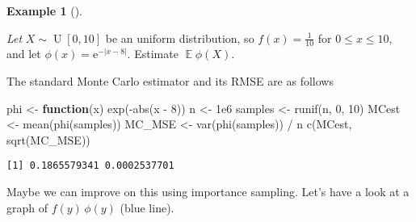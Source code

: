 \documentclass[
  letterpaper,
  DIV=11,
  numbers=noendperiod]{scrreprt}
\newenvironment{Shaded}{\begin{snugshade}}{\end{snugshade}}
\newcommand{\ControlFlowTok}[1]{\textcolor[rgb]{0.00,0.23,0.31}{\textbf{#1}}}
\newcommand{\DecValTok}[1]{\textcolor[rgb]{0.68,0.00,0.00}{#1}}
\newcommand{\FloatTok}[1]{\textcolor[rgb]{0.68,0.00,0.00}{#1}}
\newcommand{\FunctionTok}[1]{\textcolor[rgb]{0.28,0.35,0.67}{#1}}
\newcommand{\NormalTok}[1]{\textcolor[rgb]{0.00,0.23,0.31}{#1}}
\newcommand{\OtherTok}[1]{\textcolor[rgb]{0.00,0.23,0.31}{#1}}
\newcommand{\SpecialCharTok}[1]{\textcolor[rgb]{0.37,0.37,0.37}{#1}}
\newcommand{\Exg}{\operatorname{\mathbb{E}}}
\theoremstyle{plain}
\theoremstyle{definition}
\theoremstyle{definition}
\newtheorem{example}{Example}[chapter]
\theoremstyle{remark}
\begin{document}
\begin{example}[]\protect\hypertarget{exm-ISnew}{}\label{exm-ISnew}

\emph{Let} \(X \sim \operatorname{U}[0, 10]\) be an uniform
distribution, so \(f(x) = \frac{1}{10}\) for \(0 \leq x \leq 10\), and
let \(\phi(x) = \mathrm{e}^{-|x-8|}\). Estimate \(\Exg\phi(X)\).

The standard Monte Carlo estimator and its RMSE are as follows

\begin{Shaded}
\begin{Highlighting}[]
\NormalTok{phi }\OtherTok{\textless{}{-}} \ControlFlowTok{function}\NormalTok{(x) }\FunctionTok{exp}\NormalTok{(}\SpecialCharTok{{-}}\FunctionTok{abs}\NormalTok{(x }\SpecialCharTok{{-}} \DecValTok{8}\NormalTok{))}
\NormalTok{n }\OtherTok{\textless{}{-}} \FloatTok{1e6}
\NormalTok{samples }\OtherTok{\textless{}{-}} \FunctionTok{runif}\NormalTok{(n, }\DecValTok{0}\NormalTok{, }\DecValTok{10}\NormalTok{)}
\NormalTok{MCest }\OtherTok{\textless{}{-}} \FunctionTok{mean}\NormalTok{(}\FunctionTok{phi}\NormalTok{(samples))}
\NormalTok{MC\_MSE }\OtherTok{\textless{}{-}} \FunctionTok{var}\NormalTok{(}\FunctionTok{phi}\NormalTok{(samples)) }\SpecialCharTok{/}\NormalTok{ n}
\FunctionTok{c}\NormalTok{(MCest, }\FunctionTok{sqrt}\NormalTok{(MC\_MSE))}
\end{Highlighting}
\end{Shaded}

\begin{verbatim}
[1] 0.1865579341 0.0002537701
\end{verbatim}

Maybe we can improve on this using importance sampling. Let's have a
look at a graph of \(f(y)\,\phi(y)\) (blue line).


\end{example}
\end{document}
